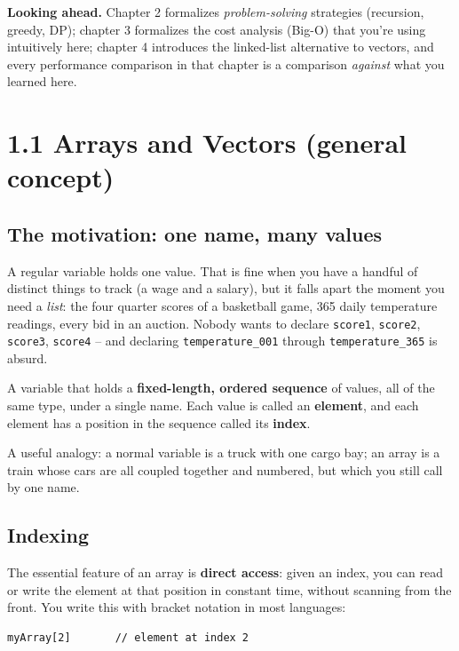 \documentclass[11pt]{article}
\begin{document}
\begin{ideabox}
\textbf{Looking ahead.} Chapter 2 formalizes \emph{problem-solving}
strategies (recursion, greedy, DP); chapter 3 formalizes the cost analysis
(Big-O) that you're using intuitively here; chapter 4 introduces the
linked-list alternative to vectors, and every performance comparison in that
chapter is a comparison \emph{against} what you learned here.
\end{ideabox}

\section{1.1 Arrays and Vectors (general concept)}

\subsection{The motivation: one name, many values}

A regular variable holds one value. That is fine when you have a handful
of distinct things to track (a wage and a salary), but it falls apart
the moment you need a \emph{list}: the four quarter scores of a
basketball game, 365 daily temperature readings, every bid in an
auction. Nobody wants to declare \texttt{score1}, \texttt{score2},
\texttt{score3}, \texttt{score4} -- and declaring
\texttt{temperature\_001} through \texttt{temperature\_365} is absurd.

\begin{defnbox}[Array]
A variable that holds a \textbf{fixed-length, ordered sequence} of
values, all of the same type, under a single name. Each value is called
an \textbf{element}, and each element has a position in the sequence
called its \textbf{index}.
\end{defnbox}

A useful analogy: a normal variable is a truck with one cargo bay; an
array is a train whose cars are all coupled together and numbered, but
which you still call by one name.

\subsection{Indexing}

The essential feature of an array is \textbf{direct access}: given an
index, you can read or write the element at that position in constant
time, without scanning from the front. You write this with bracket
notation in most languages:
\begin{lstlisting}
myArray[2]       // element at index 2
\end{lstlisting}
\end{document}
